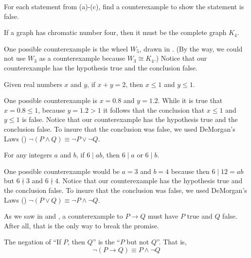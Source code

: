 \begin{exam}
\label{exam_cex_conditionals}
    For each statement from  (a)-(c), find a counterexample to show the statement is false.
        \begin{apart} 
            \item If a graph has chromatic number four, then it must be the complete graph $K_4$.
                \begin{soln}
                    One possible counterexample is the wheel $W_5$, drawn in .  (By the way, we could not use $W_3$ as a counterexample because $W_3 \cong K_4$.)  Notice that our counterexample has the hypothesis true and the conclusion false.
                \end{soln}
            \item Given real numbers $x$ and $y$, if $x + y = 2$, then $x \le 1$ and $y \le 1$.
                \begin{soln}
                    One possible counterexample is $x = 0.8$ and $y=1.2$.  While it is true that $x=0.8 \le 1$, because $y = 1.2 > 1$ it follows that the conclusion that $x \le 1$ and $y \le 1$ is false.  Notice that our counterexample has the hypothesis true and the conclusion false.  To insure that the conclusion was false, we used DeMorgan's Laws () $\neg(P \land Q) \equiv \neg P \lor \neg Q$.
                \end{soln}
            \item For any integers $a$ and $b$, if $6 \mid ab$, then $6 \mid a$ or $6 \mid b$.  
                \begin{soln}
                    One possible counterexample would be $a = 3$ and $b = 4$ because then $6 \mid 12 = ab$ but $6 \nmid 3$ and $6 \nmid 4$. Notice that our counterexample has the hypothesis true and the conclusion false.  To insure that the conclusion was false, we used DeMorgan's Laws () $\neg(P \lor Q) \equiv \neg P \land \neg Q$.
                \end{soln}
        \end{apart}   
\end{exam}

As we saw in  and , a counterexample to $P \to Q$ must have $P$ true and $Q$ false.  After all, that is the only way to break the promise.

\begin{thm}
\label{thm_broken_promise}
    The negation of ``If $P$, then $Q$'' is the  ``$P$ but not $Q$''.  That is, 
    $$\neg(P \to Q) \equiv P \land \neg Q$$
\end{thm}

